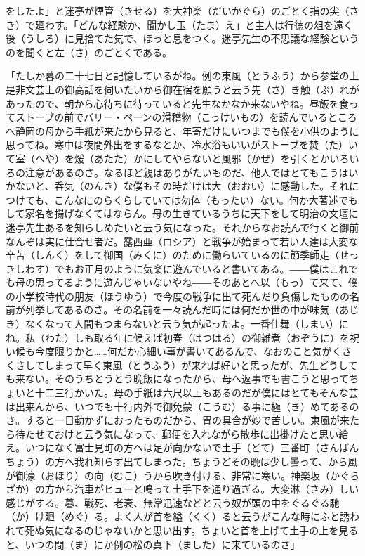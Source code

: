 \documentclass{book}
\begin{document}
をしたよ」と迷亭が煙管（きせる）を大神楽（だいかぐら）のごとく指の尖（さき）で廻わす。「どんな経験か、聞かし玉（たま）え」と主人は行徳の俎を遠く後（うしろ）に見捨てた気で、ほっと息をつく。迷亭先生の不思議な経験というのを聞くと左（さ）のごとくである。

「たしか暮の二十七日と記憶しているがね。例の東風（とうふう）から参堂の上是非文芸上の御高話を伺いたいから御在宿を願うと云う先（さ）き触（ぶ）れがあったので、朝から心待ちに待っていると先生なかなか来ないやね。昼飯を食ってストーブの前でバリー・ペーンの滑稽物（こっけいもの）を読んでいるところへ静岡の母から手紙が来たから見ると、年寄だけにいつまでも僕を小供のように思ってね。寒中は夜間外出をするなとか、冷水浴もいいがストーブを焚（た）いて室（へや）を煖（あたた）かにしてやらないと風邪（かぜ）を引くとかいろいろの注意があるのさ。なるほど親はありがたいものだ、他人ではとてもこうはいかないと、呑気（のんき）な僕もその時だけは大（おおい）に感動した。それにつけても、こんなにのらくらしていては勿体（もったい）ない。何か大著述でもして家名を揚げなくてはならん。母の生きているうちに天下をして明治の文壇に迷亭先生あるを知らしめたいと云う気になった。それからなお読んで行くと御前なんぞは実に仕合せ者だ。露西亜（ロシア）と戦争が始まって若い人達は大変な辛苦（しんく）をして御国（みくに）のために働らいているのに節季師走（せっきしわす）でもお正月のように気楽に遊んでいると書いてある。――僕はこれでも母の思ってるように遊んじゃいないやね――そのあとへ以（もっ）て来て、僕の小学校時代の朋友（ほうゆう）で今度の戦争に出て死んだり負傷したものの名前が列挙してあるのさ。その名前を一々読んだ時には何だか世の中が味気（あじき）なくなって人間もつまらないと云う気が起ったよ。一番仕舞（しまい）にね。私（わた）しも取る年に候えば初春（はつはる）の御雑煮（おぞうに）を祝い候も今度限りかと\ldots{}\ldots{}何だか心細い事が書いてあるんで、なおのこと気がくさくさしてしまって早く東風（とうふう）が来れば好いと思ったが、先生どうしても来ない。そのうちとうとう晩飯になったから、母へ返事でも書こうと思ってちょいと十二三行かいた。母の手紙は六尺以上もあるのだが僕にはとてもそんな芸は出来んから、いつでも十行内外で御免蒙（こうむ）る事に極（き）めてあるのさ。すると一日動かずにおったものだから、胃の具合が妙で苦しい。東風が来たら待たせておけと云う気になって、郵便を入れながら散歩に出掛けたと思い給え。いつになく富士見町の方へは足が向かないで土手（どて）三番町（さんばんちょう）の方へ我れ知らず出てしまった。ちょうどその晩は少し曇って、から風が御濠（おほり）の向（むこ）うから吹き付ける、非常に寒い。神楽坂（かぐらざか）の方から汽車がヒューと鳴って土手下を通り過ぎる。大変淋（さみ）しい感じがする。暮、戦死、老衰、無常迅速などと云う奴が頭の中をぐるぐる馳（か）け廻（めぐ）る。よく人が首を縊（くく）ると云うがこんな時にふと誘われて死ぬ気になるのじゃないかと思い出す。ちょいと首を上げて土手の上を見ると、いつの間（ま）にか例の松の真下（ました）に来ているのさ」
\end{document}
